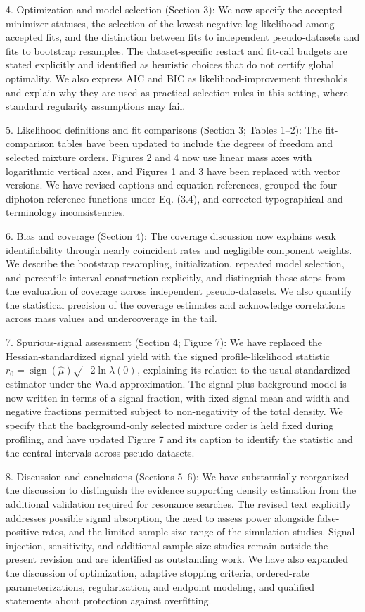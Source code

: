 \documentclass[11pt,a4paper]{article}
\begin{document}
4. Optimization and model selection (Section 3): We now specify the accepted minimizer statuses, the selection of the lowest negative log-likelihood among accepted fits, and the distinction between fits to independent pseudo-datasets and fits to bootstrap resamples. The dataset-specific restart and fit-call budgets are stated explicitly and identified as heuristic choices that do not certify global optimality. We also express AIC and BIC as likelihood-improvement thresholds and explain why they are used as practical selection rules in this setting, where standard regularity assumptions may fail.

5. Likelihood definitions and fit comparisons (Section 3; Tables 1–2): The fit-comparison tables have been updated to include the degrees of freedom and selected mixture orders. Figures 2 and 4 now use linear mass axes with logarithmic vertical axes, and Figures 1 and 3 have been replaced with vector versions. We have revised captions and equation references, grouped the four diphoton reference functions under Eq. (3.4), and corrected typographical and terminology inconsistencies. 

6. Bias and coverage (Section 4): The coverage discussion now explains weak identifiability through nearly coincident rates and negligible component weights. We describe the bootstrap resampling, initialization, repeated model selection, and percentile-interval construction explicitly, and distinguish these steps from the evaluation of coverage across independent pseudo-datasets. We also quantify the statistical precision of the coverage estimates and acknowledge correlations across mass values and undercoverage in the tail.

7. Spurious-signal assessment (Section 4; Figure 7): We have replaced the Hessian-standardized signal yield with the signed profile-likelihood statistic \(r_0=\operatorname{sign}(\hat{\mu})\sqrt{-2\ln\lambda(0)}\), explaining its relation to the usual standardized estimator under the Wald approximation. The signal-plus-background model is now written in terms of a signal fraction, with fixed signal mean and width and negative fractions permitted subject to non-negativity of the total density. We specify that the background-only selected mixture order is held fixed during profiling, and have updated Figure 7 and its caption to identify the statistic and the central intervals across pseudo-datasets.

8. Discussion and conclusions (Sections 5–6): We have substantially reorganized the discussion to distinguish the evidence supporting density estimation from the additional validation required for resonance searches. The revised text explicitly addresses possible signal absorption, the need to assess power alongside false-positive rates, and the limited sample-size range of the simulation studies. Signal-injection, sensitivity, and additional sample-size studies remain outside the present revision and are identified as outstanding work. We have also expanded the discussion of optimization, adaptive stopping criteria, ordered-rate parameterizations, regularization, and endpoint modeling, and qualified statements about protection against overfitting.
\end{document}
